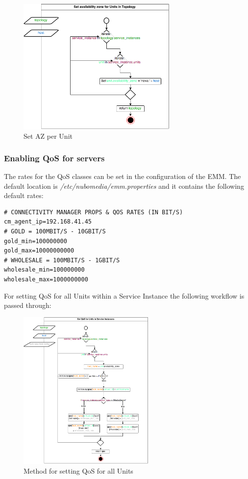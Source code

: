\begin{figure}[H]
\centering

\includegraphics[width=0.7\textwidth]{images/design/cm_set_az_topology}

\caption{Set AZ per Unit}
\end{figure}

\subsubsection{Enabling QoS for servers}

The rates for the QoS classes can be set in the configuration of the EMM.
The default location is \textit{/etc/nubomedia/emm.properties} and it contains the following default rates:
\begin{lstlisting}[language=commands]
# CONNECTIVITY MANAGER PROPS & QOS RATES (IN BIT/S)
cm_agent_ip=192.168.41.45
# GOLD = 100MBIT/S - 10GBIT/S
gold_min=100000000
gold_max=10000000000
# WHOLESALE = 100MBIT/S - 1GBIT/S
wholesale_min=100000000
wholesale_max=1000000000
\end{lstlisting}

For setting QoS for all Units within a Service Instance the following workflow is passed through:

\begin{figure}[H]
\centering

\includegraphics[width=0.6\textwidth]{images/design/cm_set_qos.png}

\caption{Method for setting QoS for all Units}
\end{figure}

